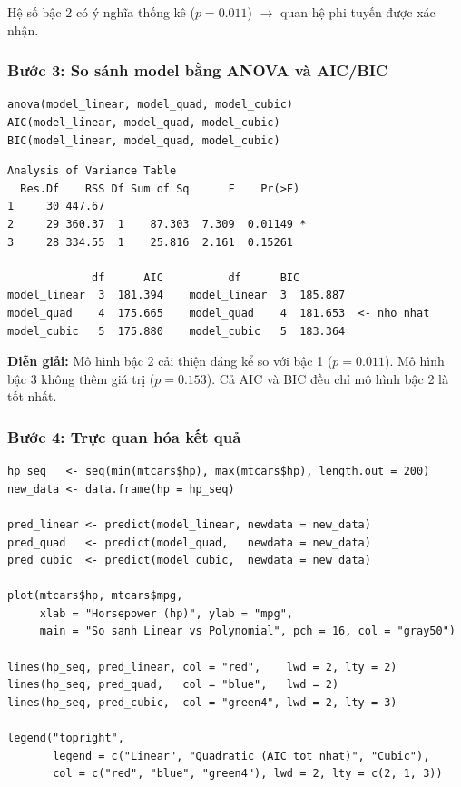 \documentclass[12pt, a4paper]{article}
\begin{document}
Hệ số bậc 2 có ý nghĩa thống kê ($p = 0.011$) $\to$ quan hệ phi tuyến được xác nhận.

\subsubsection*{Bước 3: So sánh model bằng ANOVA và AIC/BIC}

\begin{lstlisting}[style=Rstyle]
anova(model_linear, model_quad, model_cubic)
AIC(model_linear, model_quad, model_cubic)
BIC(model_linear, model_quad, model_cubic)
\end{lstlisting}

\begin{lstlisting}[style=output]
Analysis of Variance Table
  Res.Df    RSS Df Sum of Sq      F    Pr(>F)
1     30 447.67
2     29 360.37  1    87.303  7.309  0.01149 *
3     28 334.55  1    25.816  2.161  0.15261

             df      AIC          df      BIC
model_linear  3  181.394    model_linear  3  185.887
model_quad    4  175.665    model_quad    4  181.653  <- nho nhat
model_cubic   5  175.880    model_cubic   5  183.364
\end{lstlisting}

\textbf{Diễn giải:} Mô hình bậc 2 cải thiện đáng kể so với bậc 1 ($p=0.011$). Mô hình bậc 3 không thêm giá trị ($p=0.153$). Cả AIC và BIC đều chỉ mô hình bậc 2 là tốt nhất.

\subsubsection*{Bước 4: Trực quan hóa kết quả}

\begin{lstlisting}[style=Rstyle]
hp_seq   <- seq(min(mtcars$hp), max(mtcars$hp), length.out = 200)
new_data <- data.frame(hp = hp_seq)

pred_linear <- predict(model_linear, newdata = new_data)
pred_quad   <- predict(model_quad,   newdata = new_data)
pred_cubic  <- predict(model_cubic,  newdata = new_data)

plot(mtcars$hp, mtcars$mpg,
     xlab = "Horsepower (hp)", ylab = "mpg",
     main = "So sanh Linear vs Polynomial", pch = 16, col = "gray50")

lines(hp_seq, pred_linear, col = "red",    lwd = 2, lty = 2)
lines(hp_seq, pred_quad,   col = "blue",   lwd = 2)
lines(hp_seq, pred_cubic,  col = "green4", lwd = 2, lty = 3)

legend("topright",
       legend = c("Linear", "Quadratic (AIC tot nhat)", "Cubic"),
       col = c("red", "blue", "green4"), lwd = 2, lty = c(2, 1, 3))
\end{lstlisting}
\end{document}
